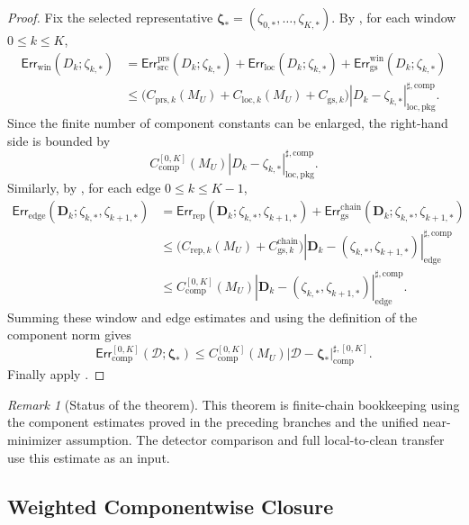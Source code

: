 \documentclass[11pt]{article}
\numberwithin{equation}{section}
\theoremstyle{definition}
\theoremstyle{remark}
\newtheorem{remark}[remark]{Remark}
\newcommand{\loc}{\mathrm{loc}}
\newcommand{\pkg}{\mathrm{pkg}}
\newcommand{\prs}{\mathrm{prs}}
\newcommand{\src}{\mathrm{src}}
\newcommand{\rep}{\mathrm{rep}}
\newcommand{\gs}{\mathrm{gs}}
\newcommand{\locerr}{\mathrm{loc}}
\newcommand{\comp}{\mathrm{comp}}
\newcommand{\chain}{\mathrm{chain}}
\newcommand{\Err}{\mathsf{Err}}
\newcommand{\calD}{\mathcal D}
\newcommand{\bfD}{\mathbf D}
\newcommand{\bzeta}{\boldsymbol\zeta}
\begin{document}
\begin{proof}
Fix the selected representative
\(\bzeta_*=(\zeta_{0,*},\ldots,\zeta_{K,*})\).  By , for each window \(0\le k\le K\),
\[
\begin{aligned}
    \Err_{\mathrm{win}}(D_k;\zeta_{k,*})
    &=
    \Err_{\src}^{\prs}(D_k;\zeta_{k,*})
    +
    \Err_{\locerr}(D_k;\zeta_{k,*})
    +
    \Err_{\gs}^{\mathrm{win}}(D_k;\zeta_{k,*})\\
    &\le
    \bigl(
        C_{{\prs},k}(M_U)
        +
        C_{{\locerr},k}(M_U)
        +
        C_{{\gs},k}
    \bigr)
    |D_k-\zeta_{k,*}|_{\loc,\pkg}^{\sharp,\comp}.
\end{aligned}
\]
Since the finite number of component constants can be enlarged, the right-hand
side is bounded by
\[
    C_{\comp}^{[0,K]}(M_U)
    |D_k-\zeta_{k,*}|_{\loc,\pkg}^{\sharp,\comp}.
\]
Similarly, by , for each edge
\(0\le k\le K-1\),
\[
\begin{aligned}
    \Err_{\mathrm{edge}}(\bfD_k;\zeta_{k,*},\zeta_{k+1,*})
    &=
    \Err_{\rep}(\bfD_k;\zeta_{k,*},\zeta_{k+1,*})
    +
    \Err_{\gs}^{\chain}(\bfD_k;\zeta_{k,*},\zeta_{k+1,*})\\
    &\le
    \bigl(
        C_{{\rep},k}(M_U)
        +
        C_{{\gs},k}^{\chain}
    \bigr)
    |\bfD_k-(\zeta_{k,*},\zeta_{k+1,*})|_{\mathrm{edge}}^{\sharp,\comp}\\
    &\le
    C_{\comp}^{[0,K]}(M_U)
    |\bfD_k-(\zeta_{k,*},\zeta_{k+1,*})|_{\mathrm{edge}}^{\sharp,\comp}.
\end{aligned}
\]
Summing these window and edge estimates and using the definition of the
component norm gives
\[
    \Err_{\comp}^{[0,K]}(\calD;\bzeta_*)
    \le
    C_{\comp}^{[0,K]}(M_U)
    |\calD-\bzeta_*|_{\comp}^{\sharp,[0,K]}.
\]
Finally apply .
\end{proof}

\begin{remark}[Status of the theorem]
This theorem is finite-chain bookkeeping using the component estimates
proved in the preceding branches and the unified near-minimizer assumption.
The detector comparison and full local-to-clean transfer use this estimate as
an input.
\end{remark}

\subsection{Weighted Componentwise Closure}
\label{comp:sec:weighted}
\end{document}
